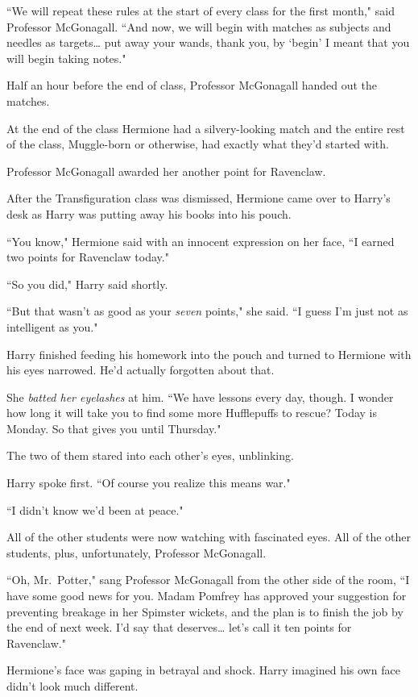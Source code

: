 ``We will repeat these rules at the start of every class for the first month," said Professor McGonagall. ``And now, we will begin with matches as subjects and needles as targets{\ldots} put away your wands, thank you, by `begin' I meant that you will begin taking notes."

Half an hour before the end of class, Professor McGonagall handed out the matches.

At the end of the class Hermione had a silvery-looking match and the entire rest of the class, Muggle-born or otherwise, had exactly what they'd started with.

Professor McGonagall awarded her another point for Ravenclaw.

\later

After the Transfiguration class was dismissed, Hermione came over to Harry's desk as Harry was putting away his books into his pouch.

``You know," Hermione said with an innocent expression on her face, ``I earned two points for Ravenclaw today."

``So you did," Harry said shortly.

``But that wasn't as good as your \emph{seven} points," she said. ``I guess I'm just not as intelligent as you."

Harry finished feeding his homework into the pouch and turned to Hermione with his eyes narrowed. He'd actually forgotten about that.

She \emph{batted her eyelashes} at him. ``We have lessons every day, though. I wonder how long it will take you to find some more Hufflepuffs to rescue? Today is Monday. So that gives you until Thursday."

The two of them stared into each other's eyes, unblinking.

Harry spoke first. ``Of course you realize this means war."

``I didn't know we'd been at peace."

All of the other students were now watching with fascinated eyes. All of the other students, plus, unfortunately, Professor McGonagall.

``Oh, Mr.~Potter," sang Professor McGonagall from the other side of the room, ``I have some good news for you. Madam Pomfrey has approved your suggestion for preventing breakage in her Spimster wickets, and the plan is to finish the job by the end of next week. I'd say that deserves{\ldots} let's call it ten points for Ravenclaw."

Hermione's face was gaping in betrayal and shock. Harry imagined his own face didn't look much different.

